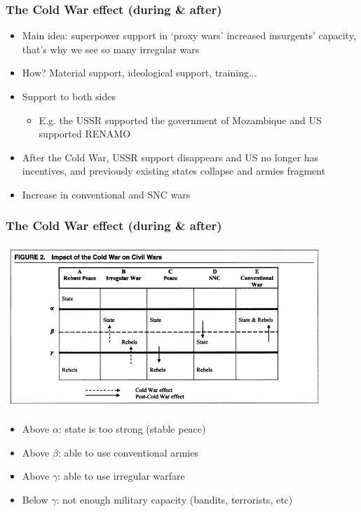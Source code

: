 \documentclass[aspectratio=43]{beamer}
\begin{document}
\begin{frame}
\frametitle{The Cold War effect (during \& after)}
\centering

\begin{itemize}
  \item Main idea: superpower support in `proxy wars' increased insurgents' capacity, that's why we see so many irregular wars
  \item How? Material support, ideological support, training...
  \item Support to both sides
  \begin{itemize}
    \item E.g. the USSR supported the government of Mozambique and US supported RENAMO
  \end{itemize}
  \item After the Cold War, USSR support disappears and US no longer has incentives, and previously existing states collapse and armies fragment
  \item Increase in conventional and SNC wars
\end{itemize}

\end{frame}


\begin{frame}
\frametitle{The Cold War effect (during \& after)}
\centering

\includegraphics[width = 0.9\textwidth]{img/kalyvas_balcells_cold_war}

\begin{itemize}
  \item Above $\alpha$: state is too strong (stable peace)
  \item Above $\beta$: able to use conventional armies
  \item Above $\gamma$: able to use irregular warfare
  \item Below $\gamma$: not enough military capacity (bandits, terrorists, etc)
\end{itemize}

\end{frame}
\end{document}
